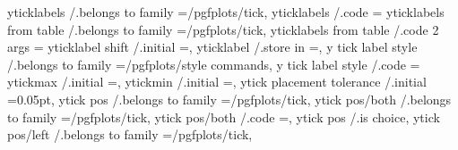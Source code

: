 {{{{{{{{{{{{{yticklabels                   /.belongs to family                                                                                                                =/pgfplots/tick,
yticklabels                   /.code                                                                                                                             ={%
yticklabels from table        /.belongs to family                                                                                                                =/pgfplots/tick,
yticklabels from table        /.code 2 args                                                                                                                      ={%
yticklabel shift              /.initial                                                                                                                          =,
yticklabel                    /.store in                                                                                                                         =\pgfplots@yticklabel,
y tick label style            /.belongs to family                                                                                                                =/pgfplots/style commands,
y tick label style            /.code                                                                                                                             ={%
ytickmax                      /.initial                                                                                                                          =,
ytickmin                      /.initial                                                                                                                          =,
ytick placement tolerance     /.initial                                                                                                                          =0.05pt,
ytick pos                     /.belongs to family                                                                                                                =/pgfplots/tick,
ytick pos/both                /.belongs to family                                                                                                                =/pgfplots/tick,
ytick pos/both                /.code                                                                                                                             ={\def\pgfplots@ytickposnum{0}},
ytick pos                     /.is choice,                                                                                                                 
ytick pos/left                /.belongs to family                                                                                                                =/pgfplots/tick,
}}}}}}}}}}}}}}}}
